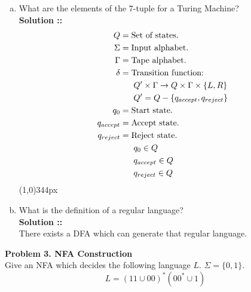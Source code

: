 \documentclass[11pt]{article}
\begin{document}
\begin{enumerate}[a.]
\item What are the elements of the 7-tuple for a Turing Machine? \\
\vspace{5px}\textbf{Solution ::}
\begin{align*}
    Q &= \text{Set of states.} \\
    \Sigma &= \text{Input alphabet.} \\
    \Gamma &= \text{Tape alphabet.} \\
    \delta &= \text{Transition function: } \\
    &\hspace{16px}Q'\times\Gamma
    \rightarrow Q\times\Gamma\times\{L, R\} \\
    &\hspace{16px}Q' = Q - \{q_{accept}, q_{reject}\} \\
    q_0 &= \text{Start state.} \\
    q_{accept} &= \text{Accept state.} \\
    q_{reject} &= \text{Reject state.} \\
    &\hspace{16px}q_0\in Q \\
    &\hspace{16px}q_{accept}\in Q \\
    &\hspace{16px}q_{reject}\in Q
\end{align*}
\line(1,0){344px}

\item What is the definition of a regular language? \\
\vspace{5px}\textbf{Solution ::} \\
There exists a DFA which can generate that regular language.
\end{enumerate}
\pagebreak


\textbf{Problem 3. NFA Construction} \\
Give an NFA which decides the following language $L$. $\Sigma=\{0,1\}$.
$$L = (11\cup00)^*(00^*\cup 1)$$
\end{document}
